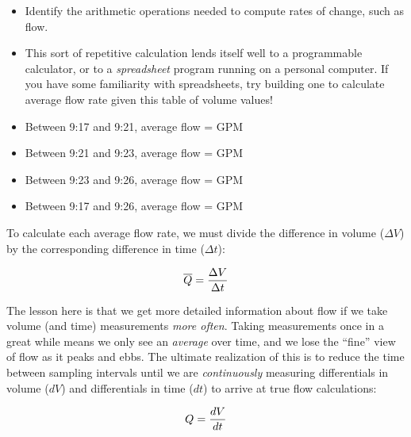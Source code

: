 \begin{itemize}
\item{} Identify the arithmetic operations needed to compute rates of change, such as flow.
\item{} This sort of repetitive calculation lends itself well to a programmable calculator, or to a {\it spreadsheet} program running on a personal computer.  If you have some familiarity with spreadsheets, try building one to calculate average flow rate given this table of volume values!
\end{itemize}







\begin{itemize}
\item{} Between 9:17 and 9:21, average flow =  GPM
\vskip 5pt
\item{} Between 9:21 and 9:23, average flow =  GPM
\vskip 5pt
\item{} Between 9:23 and 9:26, average flow =  GPM
\vskip 10pt
\item{} Between 9:17 and 9:26, average flow =  GPM
\end{itemize}







To calculate each average flow rate, we must divide the difference in volume ($\Delta V$) by the corresponding difference in time ($\Delta t$):

$$\overline{Q} = {\Delta V \over \Delta t}$$

\vskip 10pt

The lesson here is that we get more detailed information about flow if we take volume (and time) measurements {\it more often}.  Taking measurements once in a great while means we only see an {\it average} over time, and we lose the ``fine'' view of flow as it peaks and ebbs.  The ultimate realization of this is to reduce the time between sampling intervals until we are {\it continuously} measuring differentials in volume ($dV$) and differentials in time ($dt$) to arrive at true flow calculations:

$$Q = {dV \over dt}$$





